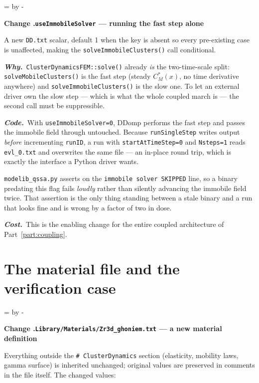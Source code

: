 \documentclass[11pt,a4paper]{article}
\newcommand{\code}[1]{\texttt{\small #1}}
\newcommand{\needlines}[1]{%
  \par\dimen0=\pagegoal \advance\dimen0 by -\pagetotal
  \ifdim\dimen0<#1\baselineskip \newpage \fi}
\newcounter{chg}
\newcommand{\change}[1]{%
  \needlines{4}%
  \refstepcounter{chg}%
  \par\medskip\noindent
  {\bfseries\boldmath Change \thechg.\quad #1}%
  \par\nobreak\smallskip}
\newcommand{\why}[1]{\par\noindent\textbf{\itshape Why.}\ #1\par}
\newcommand{\impact}[1]{\par\noindent\textbf{\itshape Code.}\ #1\par}
\newcommand{\cost}[1]{\par\noindent\textbf{\itshape Cost.}\ #1\par}
\begin{document}
\change{\code{useImmobileSolver} --- running the fast step alone}
\label{chg:useimmobile}
A new \code{DD.txt} scalar, default 1 when the key is absent so every
pre-existing case is unaffected, making the \code{solveImmobileClusters()}
call conditional.
\why{\code{ClusterDynamicsFEM::solve()} already \emph{is} the two-time-scale
split: \code{solveMobileClusters()} is the fast step (steady $C_M^*(x)$, no
time derivative anywhere) and \code{solveImmobileClusters()} is the slow one.
To let an external driver own the slow step --- which is what the whole
coupled march is --- the second call must be suppressible.}
\impact{With \code{useImmobileSolver=0}, DDomp performs the fast step and
passes the immobile field through untouched. Because \code{runSingleStep}
writes output \emph{before} incrementing \code{runID}, a run with
\code{startAtTimeStep=0} and \code{Nsteps=1} reads \code{evl\_0.txt} and
overwrites the same file --- an in-place round trip, which is exactly the
interface a Python driver wants.

\code{modelib\_qssa.py} asserts on the \code{immobile solver SKIPPED} line, so
a binary predating this flag fails \emph{loudly} rather than silently advancing
the immobile field twice. That assertion is the only thing standing between a
stale binary and a run that looks fine and is wrong by a factor of two in
dose.}
\cost{This is the enabling change for the entire coupled architecture of
Part~\ref{part:coupling}.}

\part{The material file and the verification case}
\label{part:material}

\change{\code{Library/Materials/Zr3d\_ghoniem.txt} --- a new material definition}
\label{chg:material}
Everything outside the \code{\# ClusterDynamics} section (elasticity, mobility
laws, gamma surface) is inherited unchanged; original values are preserved in
comments in the file itself. The changed values:
\end{document}
